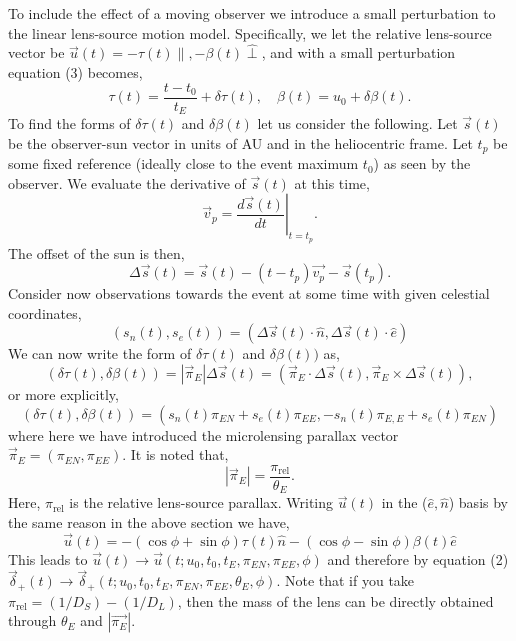 \documentclass[11pt]{article}
\begin{document}
To include the effect of a moving observer we introduce a small perturbation to the linear
lens-source motion model. Specifically, we let the relative lens-source vector be 
$\vec{u}(t) = -\tau(t)\hat{\parallel},-\beta(t)\hat{\perp}$, and with a small perturbation 
equation (3) becomes,
%
\begin{equation}
\tau(t) = \frac{t-t_{0}}{t_{E}}+\delta\tau(t), \quad \beta(t) =  u_{0}+\delta\beta(t).
\end{equation}
%
To find the forms of $\delta\tau(t)$ and $\delta\beta(t)$ let us consider the following.
Let $\vec{s}(t)$ be the observer-sun vector in units of AU and in the heliocentric frame. 
Let $t_{p}$ be some fixed reference (ideally close to the event maximum $t_{0}$) as seen 
by the observer. We evaluate the derivative of $\vec{s}(t)$ at this time,
%
\begin{equation}
\vec{v}_{p} =\left. \frac{d\vec{s}(t)}{dt}\right|_{t=t_{p}}.
\end{equation}
%
The offset of the sun is then,
%
\begin{equation}
\Delta\vec{s}(t) = \vec{s}(t)-(t-t_{p})\vec{v_{p}}-\vec{s}(t_{p}).
\end{equation}
%
Consider now observations towards the event at some time with given
celestial coordinates,
%
\begin{equation}
(s_{n}(t),s_{e}(t)) = (\Delta\vec{s}(t)\cdot\hat{n},\Delta\vec{s}(t)\cdot\hat{e})
\end{equation}
%
We can now write the form of $\delta\tau(t)$ and $\delta\beta(t))$ as,
%
\begin{equation}
(\delta\tau(t),\delta\beta(t)) = |\vec{\pi}_{E}|\Delta\vec{s}(t) = 
(\vec{\pi}_{E}\cdot\Delta\vec{s}(t),\vec{\pi}_{E}\times\Delta\vec{s}(t)),
\end{equation}
%
or more explicitly,
%
\begin{equation}
(\delta\tau(t),\delta\beta(t)) =  (s_{n}(t)\pi_{EN}+s_{e}(t)\pi_{EE},
                                  -s_{n}(t)\pi_{E,E}+s_{e}(t)\pi_{EN})
\end{equation}
%
where here we have introduced the microlensing parallax vector 
$\vec{\pi}_{E} = (\pi_{EN},\pi_{EE})$. It is noted that,
%
\begin{equation}
|\vec{\pi}_{E}| = \frac{\pi_{\text{rel}}}{\theta_{E}}.
\end{equation}
%
Here, $\pi_{\text{rel}}$ is the relative lens-source parallax.
Writing $\vec{u}(t)$ in the ($\hat{e},\hat{n}$) basis by the same
reason in the above section we have,
%
\begin{equation}
\vec{u}(t) = -(\cos\phi+\sin\phi)\tau(t)\hat{n} - (\cos\phi-\sin\phi)\beta(t)\hat{e}
\end{equation}
%
This leads to $\vec{u}(t) \to \vec{u}(t;u_{0},t_{0},t_{E},\pi_{EN},\pi_{EE},\phi)$ and therefore
by equation (2) $\vec{\delta}_{+}(t) \to \vec{\delta}_{+}(t;u_{0},t_{0},t_{E},\pi_{EN},\pi_{EE},\theta_{E},\phi)$.
Note that if you take $\pi_{\text{rel}}=(1/D_{S})-(1/D_{L})$, then the mass of the lens can be directly
obtained through $\theta_{E}$ and $|\vec{\pi_{E}}|$.
\end{document}

